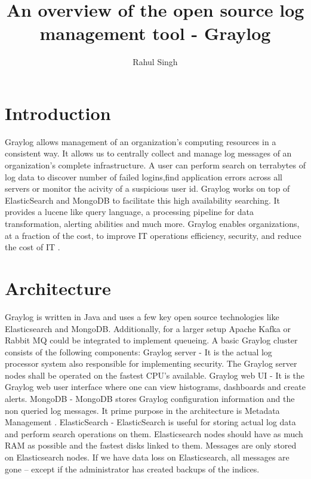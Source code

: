\documentclass[9pt,twocolumn,twoside]{../../styles/osajnl}
\title{An overview of the open source log management tool - Graylog}
\author[1]{Rahul Singh}
\affil[1]{School of Informatics and Computing, Bloomington, IN 47408, U.S.A.}
\affil[*]{Corresponding authors: rahpsing@iu.edu}
\begin{document}
\maketitle

\section{Introduction}
Graylog allows management of an organization's computing resources in
a consistent way. It allows us to centrally collect and manage log
messages of an organization’s complete infrastructure. A user can
perform search on terrabytes of log data to discover number of failed
logins,find application errors across all servers or monitor the
acivity of a suspicious user id. Graylog works on top of ElasticSearch
and MongoDB to facilitate this high availability searching. It
provides a lucene like query language, a processing pipeline for data
transformation, alerting abilities and much more. Graylog enables
organizations, at a fraction of the cost, to improve IT operations
efficiency, security, and reduce the cost of IT \cite{www-graylog-crunchbase}.


\section{Architecture}

Graylog is written in Java and uses a few key open source technologies
like Elasticsearch and MongoDB. Additionally, for a larger setup
Apache Kafka or Rabbit MQ could be integrated to implement queueing.
A basic Graylog cluster consists of the following components:
\newline
\newline
Graylog server - It is the actual log processor system also
responsible for implementing security. The Graylog server nodes shall
be operated on the fastest CPU's available.
\newline
\newline
Graylog web UI - It is the Graylog web user interface where one can
view histograms, dashboards and create alerts.
\newline
\newline
MongoDB - MongoDB stores Graylog configuration information and the non
queried log messages. It prime purpose in the architecture is Metadata
Management \cite{www-graylogprocessing-severalnines}.
\newline
\newline
ElasticSearch - ElasticSearch is useful for storing actual log data
and perform search operations on them. Elasticsearch nodes should have
as much RAM as possible and the fastest disks linked to them. Messages
are only stored on Elasticsearch nodes. If we have data loss on
Elasticsearch, all messages are gone – except if the administrator has
created backups of the indices.
\end{document}
